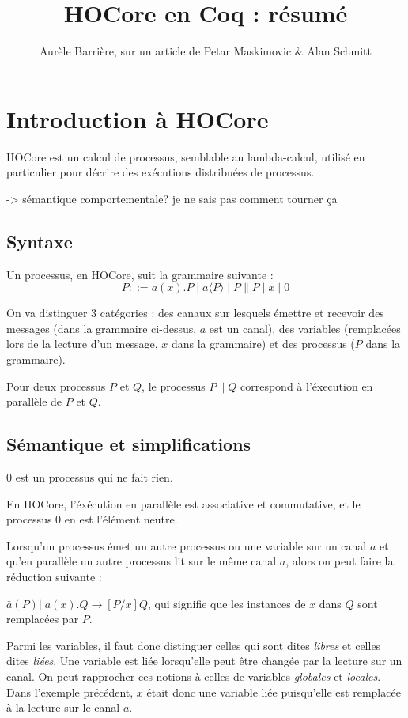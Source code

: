 \documentclass{article}
\title{HOCore en Coq : résumé}
\author{Aurèle Barrière, sur un article de Petar Maskimovic \& Alan Schmitt}
\begin{document}
\maketitle
\tableofcontents
\section{Introduction à HOCore}
HOCore est un calcul de processus, semblable au lambda-calcul, utilisé en particulier pour décrire des exécutions distribuées de processus.

-> sémantique comportementale? je ne sais pas comment tourner ça

\subsection{Syntaxe}
Un processus, en HOCore, suit la grammaire suivante :
$$ P ::= a(x).P \mid \bar{a}\langle P\rangle \mid P\|P \mid x \mid 0 $$

On va distinguer 3 catégories : des canaux sur lesquels émettre et recevoir des messages (dans la grammaire ci-dessus, $a$ est un canal), des variables (remplacées lors de la lecture d'un message, $x$ dans la grammaire) et des processus ($P$ dans la grammaire).

Pour deux processus $P$ et $Q$, le processus $P\|Q$ correspond à l'éxecution en parallèle de $P$ et $Q$.


\subsection{Sémantique et simplifications}
$0$ est un processus qui ne fait rien.

En HOCore, l'éxécution en parallèle est associative et commutative, et le processus $0$ en est l'élément neutre.

Lorsqu'un processus émet un autre processus ou une variable sur un canal $a$ et qu'en parallèle un autre processus lit sur le même canal $a$, alors on peut faire la réduction suivante :

$\bar{a}(P)||a(x).Q \rightarrow [P/x]Q$, qui signifie que les instances de $x$ dans $Q$ sont remplacées par $P$.

Parmi les variables, il faut donc distinguer celles qui sont dites \textit{libres} et celles dites \textit{liées}. 
Une variable est liée lorsqu'elle peut être changée par la lecture sur un canal. On peut rapprocher ces notions à celles de variables \textit{globales} et \textit{locales}.
Dans l'exemple précédent, $x$ était donc une variable liée puisqu'elle est remplacée à la lecture sur le canal $a$. 
\end{document}
